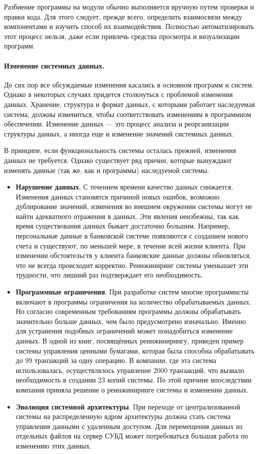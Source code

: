 \documentclass{../../text-style}
\begin{document}
Разбиение программы на модули обычно выполняется вручную путем проверки и правки кода. Для этого следует, прежде всего, определить взаимосвязи между компонентами и изучить способ их взаимодействия. Полностью автоматизировать этот процесс нельзя, даже если привлечь средства просмотра и визуализации программ.

\paragraph{Изменение системных данных.} До сих пор все обсуждаемые изменения касались в основном программ и систем. Однако в некоторых случаях придется столкнуться с проблемой изменения данных. Хранение, структура и формат данных, с которыми работает наследуемая система, должны измениться, чтобы соответствовать изменениям в программном обеспечении. Изменение данных --- это процесс анализа и реорганизации структуры данных, а иногда еще и изменение значений системных данных.

В принципе, если функциональность системы осталась прежней, изменения данных не требуется. Однако существует ряд причин, которые вынуждают изменять данные (так же, как и программы) наследуемой системы.

\begin{itemize}
    \item \textbf{Нарушение данных}. С течением времени качество данных снижается. Изменения данных становятся причиной новых ошибок, возможно дублирование значений, изменения во внешнем окружении системы могут не найти адекватного отражения в данных. Эти явления неизбежны, так как время существования данных бывает достаточно большим. Например, персональные данные в банковской системе появляются с созданием нового счета и существуют, по меньшей мере, в течение всей жизни клиента. При изменении обстоятельств у клиента банковские данные должны обновляться, что не всегда происходит корректно. Реинжиниринг системы уменьшает эти трудности, что лишний раз подтверждает его необходимость.
    \item \textbf{Программные ограничения}. При разработке систем многие программисты включают в программы ограничения на количество обрабатываемых данных. Но согласно современным требованиям программы должны обрабатывать значительно больше данных, чем было предусмотрено изначально. Именно для устранения подобных ограничений может понадобиться изменение данных. В одной из книг, посвящённых реинжинирингу, приведен пример системы управления ценными бумагами, которая была способна обрабатывать до 99 транзакций за одну операцию. В компании, где эта система использовалась, осуществлялось управление 2000 транзакций, что вызвало необходимость в создании 23 копий системы. По этой причине впоследствии компания приняла решение о реинжиниринге системы и изменении данных.
    \item \textbf{Эволюция системной архитектуры}. При переходе от централизованной системы на распределенную ядром архитектуры должна стать система управления данными с удаленным доступом. Для перемещения данных из отдельных файлов на сервер СУБД может потребоваться большая работа по изменению этих данных.
\end{itemize}
\end{document}
